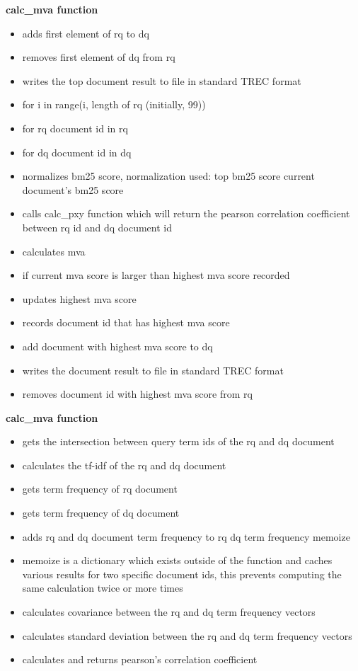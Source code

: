 \documentclass{article} %
\begin{document}
\textbf{calc\_mva function}

\begin{itemize}
    \item adds first element of rq to dq
    \item removes first element of dq from rq
    \item writes the top document result to file in standard TREC format
    \item for i in range(i, length of rq (initially, 99))
    \item for rq document id in rq
    \item for dq document id in dq
    \item normalizes bm25 score, normalization used: top bm25 score \/ current document's bm25 score
    \item calls calc\_pxy function which will return the pearson correlation coefficient between rq id and dq document id
    \item calculates mva
    \item if current mva score is larger than highest mva score recorded
    \item updates highest mva score
    \item records document id that has highest mva score
    \item add document with highest mva score to dq
    \item writes the document result to file in standard TREC format
    \item removes document id with highest mva score from rq
\end{itemize}

\textbf{calc\_mva function}

\begin{itemize}
    \item gets the intersection between query term ids of the rq and dq document
    \item calculates the tf-idf of the rq and dq document
    \item gets term frequency of rq document
    \item gets term frequency of dq document
    \item adds rq and dq document term frequency to rq dq term frequency memoize
    \item memoize is a dictionary which exists outside of the function and caches various results for two specific document ids, this prevents computing the same calculation twice or more times
    \item calculates covariance between the rq and dq term frequency vectors
    \item calculates standard deviation between the rq and dq term frequency vectors
    \item calculates and returns pearson's correlation coefficient
\end{itemize}
\end{document}
